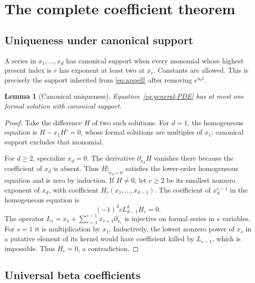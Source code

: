 \documentclass[11pt,letterpaper]{article}
\numberwithin{equation}{section}
\theoremstyle{plain}
\newtheorem{lemma}[theorem]{Lemma}
\theoremstyle{definition}
\theoremstyle{remark}
\begin{document}


\section{The complete coefficient theorem}
\label{sec:universal}

\subsection{Uniqueness under canonical support}

A series in $x_1,\ldots,x_d$ has canonical support when every monomial whose highest present index is $r$ has exponent at least two at $x_r$. Constants are allowed. This is precisely the support inherited from \eqref{eq:appell} after removing $e^{u_0t}$.

\begin{lemma}[Canonical uniqueness]\label{lem:unique}
Equation~\eqref{eq:general-PDE} has at most one formal solution with canonical support.
\end{lemma}
\begin{proof}
Take the difference $H$ of two such solutions. For $d=1$, the homogeneous equation is $H-x_1H'=0$, whose formal solutions are multiples of $x_1$; canonical support excludes that monomial.

For $d\ge2$, specialize $x_d=0$. The derivative $\partial_{x_d}H$ vanishes there because the coefficient of $x_d$ is absent. Thus $H|_{x_d=0}$ satisfies the lower-order homogeneous equation and is zero by induction. If $H\ne0$, let $c\ge2$ be its smallest nonzero exponent of $x_d$, with coefficient $H_c(x_1,\ldots,x_{d-1})$. The coefficient of $x_d^{c-1}$ in the homogeneous equation is
\[
 (-1)^d c L_{d-1}^d H_c=0.
\]
The operator $L_s=x_1+\sum_{r=1}^{s-1}x_{r+1}\partial_{x_r}$ is injective on formal series in $s$ variables. For $s=1$ it is multiplication by $x_1$. Inductively, the lowest nonzero power of $x_s$ in a putative element of its kernel would have coefficient killed by $L_{s-1}$, which is impossible. Thus $H_c=0$, a contradiction.
\end{proof}

\subsection{Universal beta coefficients}
\end{document}
